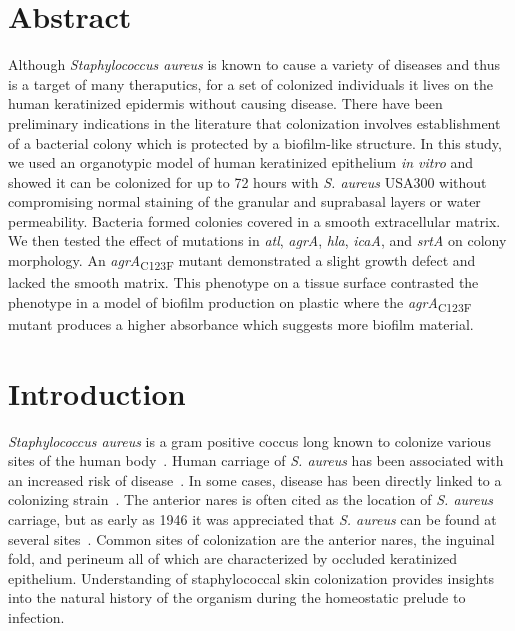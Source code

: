 \documentclass[10pt,letterpaper]{article}
\begin{document}
\section*{Abstract}
Although \textit{Staphylococcus aureus} is known to cause a variety of diseases and thus is a target of many theraputics, for a set of colonized individuals it lives on the human keratinized epidermis without causing disease.
There have been preliminary indications in the literature that colonization involves establishment of a bacterial colony which is protected by a biofilm-like structure.
In this study, we used an organotypic model of human keratinized epithelium \textit{in vitro} and showed it can be colonized for up to 72 hours with \textit{S. aureus} USA300 without compromising normal staining of the granular and suprabasal layers or water permeability.
Bacteria formed colonies covered in a smooth extracellular matrix.
We then tested the effect of mutations in \textit{atl}, \textit{agrA}, \textit{hla}, \textit{icaA}, and \textit{srtA} on colony morphology.
An \textit{agrA}\textsubscript{C123F} mutant demonstrated a slight growth defect and lacked the smooth matrix.
This phenotype on a tissue surface contrasted the phenotype in a model of biofilm production on plastic where the \textit{agrA}\textsubscript{C123F} mutant produces a higher absorbance which suggests more biofilm material.


\linenumbers

\section*{Introduction}

\textit{Staphylococcus aureus} is a gram positive coccus long known to colonize various sites of the human body~\cite{miko_high_2012,williams_healthy_1963,mermel_methicillin-resistant_2011}.
Human carriage of \textit{S. aureus} has been associated with an increased risk of disease~\cite{wertheim_risk_2004}.
In some cases, disease has been directly linked to a colonizing strain~\cite{von_eiff_nasal_2001, toshkova_significance_2001}.
The anterior nares is often cited as the location of \textit{S. aureus} carriage, but as early as 1946 it was appreciated that \textit{S. aureus} can be found at several sites~\cite{williams_skin_1946}.
Common sites of colonization are the anterior nares, the inguinal fold, and perineum all of which are characterized by occluded keratinized epithelium.
Understanding of staphylococcal skin colonization provides insights into the natural history of the organism during the homeostatic prelude to infection.
\end{document}
